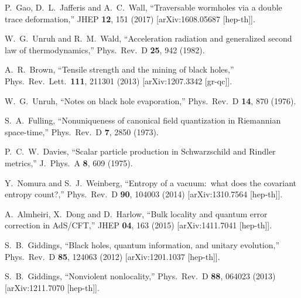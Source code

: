 \documentclass[12pt]{article}
\begin{document}
\begin{thebibliography}{99}
P.~Gao, D.~L.~Jafferis and A.~C.~Wall,
``Traversable wormholes via a double trace deformation,''
JHEP {\bf 12}, 151 (2017)
[arXiv:1608.05687 [hep-th]].

W.~G.~Unruh and R.~M.~Wald,
``Acceleration radiation and generalized second law of thermodynamics,''
Phys.\ Rev.\ D {\bf 25}, 942 (1982).

A.~R.~Brown,
``Tensile strength and the mining of black holes,''
Phys.\ Rev.\ Lett.\ {\bf 111}, 211301 (2013)
[arXiv:1207.3342 [gr-qc]].

W.~G.~Unruh,
``Notes on black hole evaporation,''
Phys.\ Rev.\ D {\bf 14}, 870 (1976).

S.~A.~Fulling,
``Nonuniqueness of canonical field quantization in Riemannian space-time,''
Phys.\ Rev.\ D {\bf 7}, 2850 (1973).

P.~C.~W.~Davies,
``Scalar particle production in Schwarzschild and Rindler metrics,''
J.\ Phys.\ A {\bf 8}, 609 (1975).

Y.~Nomura and S.~J.~Weinberg,
``Entropy of a vacuum:\ what does the covariant entropy count?,''
Phys.\ Rev.\ D {\bf 90}, 104003 (2014)
[arXiv:1310.7564 [hep-th]].

A.~Almheiri, X.~Dong and D.~Harlow,
``Bulk locality and quantum error correction in AdS/CFT,''
JHEP {\bf 04}, 163 (2015)
[arXiv:1411.7041 [hep-th]].

S.~B.~Giddings,
``Black holes, quantum information, and unitary evolution,''
Phys.\ Rev.\ D {\bf 85}, 124063 (2012)
[arXiv:1201.1037 [hep-th]].

S.~B.~Giddings,
``Nonviolent nonlocality,''
Phys.\ Rev.\ D {\bf 88}, 064023 (2013)
[arXiv:1211.7070 [hep-th]].


\end{thebibliography}
\end{document}

